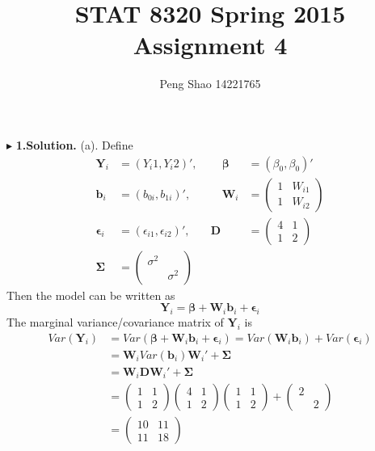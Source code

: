 \documentclass[letterpaper, 12pt]{article}
\newcommand{\ba}{$$\begin{aligned}}
\newcommand{\ea}{\end{aligned}$$}
\begin{document}
\title{STAT 8320 Spring 2015 Assignment 4}
\author{Peng Shao 14221765}
\maketitle
\indent




$\blacktriangleright$ \textbf{1.\quad Solution.} 
(a). Define
\ba
\bm{Y}_i&=(Y_i1,Y_i2)',&\quad\bm{\beta}&=(\beta_0,\beta_0)'\\
\bm{b}_i&=(b_{0i},b_{1i})', &\quad\bm{W}_i&=\left(\begin{matrix}
1&W_{i1}\\
1&W_{i2}
\end{matrix}\right)\\
\bm{\epsilon}_i&=(\epsilon_{i1},\epsilon_{i2})',\quad&\bm{D}&=\left(\begin{matrix}
4 &1\\
1 &2
\end{matrix}\right)\\
\bm{\Sigma}&=\left(\begin{matrix}
\sigma^2\\
&\sigma^2
\end{matrix}\right)
\ea
Then the model can be written as
$$
\bm{Y}_i=\bm{\beta}+\bm{W}_i\bm{b}_i+\bm{\epsilon}_i
$$
The marginal variance/covariance matrix of $\bm{Y}_i$ is 
\ba
Var(\bm{Y}_i)&=Var(\bm{\beta}+\bm{W}_i\bm{b}_i+\bm{\epsilon}_i)=Var(\bm{W}_i\bm{b}_i)+Var(\bm{\epsilon}_i)\\
&=\bm{W}_iVar(\bm{b}_i)\bm{W}_i'+\bm{\Sigma}\\
&=\bm{W}_i\bm{D}\bm{W}_i'+\bm{\Sigma}\\
&=\left(\begin{matrix}
1&1\\
1&2
\end{matrix}\right)\left(\begin{matrix}
4&1\\
1&2
\end{matrix}\right)\left(\begin{matrix}
1&1\\
1&2
\end{matrix}\right)+\left(\begin{matrix}
2\\
&2
\end{matrix}\right)\\
&=\left(\begin{matrix}
10&11\\
11&18
\end{matrix}\right)
\ea
\end{document}
